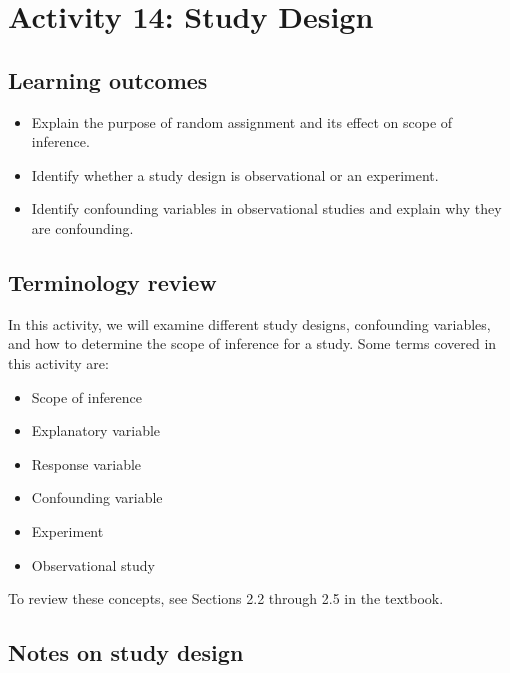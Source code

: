 \documentclass[
]{report}
\begin{document}
\newpage

\section{Activity 14: Study Design}\label{activity-14-study-design}


\subsection{Learning outcomes}\label{learning-outcomes-15}

\begin{itemize}
\item
  Explain the purpose of random assignment and its effect on scope of inference.
\item
  Identify whether a study design is observational or an experiment.
\item
  Identify confounding variables in observational studies and explain why they are confounding.
\end{itemize}

\subsection{Terminology review}\label{terminology-review-12}

In this activity, we will examine different study designs, confounding variables, and how to determine the scope of inference for a study. Some terms covered in this activity are:

\begin{itemize}
\item
  Scope of inference
\item
  Explanatory variable
\item
  Response variable
\item
  Confounding variable
\item
  Experiment
\item
  Observational study
\end{itemize}

To review these concepts, see Sections 2.2 through 2.5 in the textbook.

\subsection*{Notes on study design}\label{notes-on-study-design}
\end{document}
